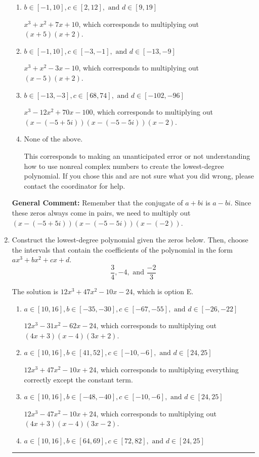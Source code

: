 \documentclass{extbook}[14pt]
\newcommand{\litem}[1]{\item #1

\rule{\textwidth}{0.4pt}}
\begin{document}
\begin{enumerate}
{\begin{enumerate}[label=\Alph*.]
* $x^{3} +12 x^{2} +70 x + 100$, which is the correct option.
\item \( b \in [-1, 10], c \in [2, 12], \text{ and } d \in [9, 19] \)

$x^{3} + x^{2} +7 x + 10$, which corresponds to multiplying out $(x + 5)(x + 2)$.
\item \( b \in [-1, 10], c \in [-3, -1], \text{ and } d \in [-13, -9] \)

$x^{3} + x^{2} -3 x -10$, which corresponds to multiplying out $(x -5)(x + 2)$.
\item \( b \in [-13, -3], c \in [68, 74], \text{ and } d \in [-102, -96] \)

$x^{3} -12 x^{2} +70 x -100$, which corresponds to multiplying out $(x-(-5 + 5 i))(x-(-5 - 5 i))(x -2)$.
\item \( \text{None of the above.} \)

This corresponds to making an unanticipated error or not understanding how to use nonreal complex numbers to create the lowest-degree polynomial. If you chose this and are not sure what you did wrong, please contact the coordinator for help.
\end{enumerate}

\textbf{General Comment:} Remember that the conjugate of $a+bi$ is $a-bi$. Since these zeros always come in pairs, we need to multiply out $(x-(-5 + 5 i))(x-(-5 - 5 i))(x-(-2))$.
}
\litem{
Construct the lowest-degree polynomial given the zeros below. Then, choose the intervals that contain the coefficients of the polynomial in the form $ax^3+bx^2+cx+d$.
\[ \frac{3}{4}, -4, \text{ and } \frac{-2}{3} \]

The solution is \( 12x^{3} +47 x^{2} -10 x -24 \), which is option E.\begin{enumerate}[label=\Alph*.]
\item \( a \in [10, 16], b \in [-35, -30], c \in [-67, -55], \text{ and } d \in [-26, -22] \)

$12x^{3} -31 x^{2} -62 x -24$, which corresponds to multiplying out $(4x + 3)(x -4)(3x + 2)$.
\item \( a \in [10, 16], b \in [41, 52], c \in [-10, -6], \text{ and } d \in [24, 25] \)

$12x^{3} +47 x^{2} -10 x + 24$, which corresponds to multiplying everything correctly except the constant term.
\item \( a \in [10, 16], b \in [-48, -40], c \in [-10, -6], \text{ and } d \in [24, 25] \)

$12x^{3} -47 x^{2} -10 x + 24$, which corresponds to multiplying out $(4x + 3)(x -4)(3x -2)$.
\item \( a \in [10, 16], b \in [64, 69], c \in [72, 82], \text{ and } d \in [24, 25] \)


\end{enumerate}}
\end{enumerate}
\end{document}
